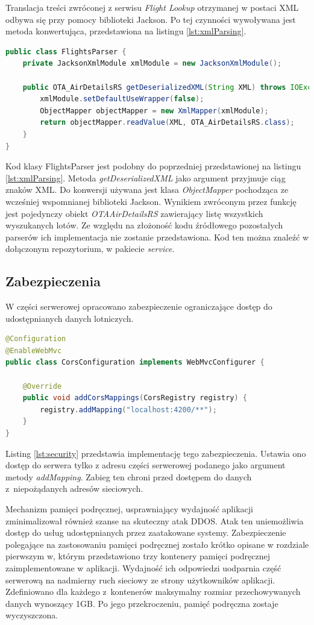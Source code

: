 \documentclass[12pt, twoside]{report}
\begin{document}
Translacja treści zwróconej z serwisu \textit{Flight Lookup} otrzymanej w postaci XML odbywa się przy pomocy biblioteki Jackson. Po tej czynności wywoływana jest metoda konwertująca, przedstawiona na listingu \ref{lst:xmlParsing}.
\begin{lstlisting}[language=java, caption=Implementacja parsowania treści XML, label=lst:xmlParsing]
public class FlightsParser {
    private JacksonXmlModule xmlModule = new JacksonXmlModule();

    public OTA_AirDetailsRS getDeserializedXML(String XML) throws IOException {
        xmlModule.setDefaultUseWrapper(false);
        ObjectMapper objectMapper = new XmlMapper(xmlModule);
        return objectMapper.readValue(XML, OTA_AirDetailsRS.class);
    }
}
\end{lstlisting}
Kod klasy FlightsParser jest podobny do poprzedniej przedstawionej na listingu \ref{lst:xmlParsing}. Metoda \textit{getDeserializedXML} jako argument przyjmuje ciąg znaków XML. Do konwersji używana jest klasa \textit{ObjectMapper} pochodząca ze wcześniej wspomnianej biblioteki Jackson. Wynikiem zwróconym przez funkcję jest pojedynczy obiekt \textit{OTAAirDetailsRS} zawierający listę wszystkich wyszukanych lotów.
Ze względu na złożoność kodu źródłowego pozostałych parserów ich implementacja nie zostanie przedstawiona. Kod ten można znaleźć w dołączonym repozytorium, w pakiecie \textit{service}.

\subsection{Zabezpieczenia}
W części serwerowej opracowano zabezpieczenie ograniczające dostęp do udostępnianych danych lotniczych.
\begin{lstlisting}[language=java, caption=Implementacja zabezpieczanie dostępu do serwera, label=lst:security]
@Configuration
@EnableWebMvc
public class CorsConfiguration implements WebMvcConfigurer {

    @Override
    public void addCorsMappings(CorsRegistry registry) {
        registry.addMapping("localhost:4200/**");
    }
}
\end{lstlisting}
Listing \ref{lst:security} przedstawia implementację tego zabezpieczenia. Ustawia ono dostęp do serwera tylko z adresu części serwerowej podanego jako argument metody \textit{addMapping}. Zabieg ten chroni przed dostępem do danych z~niepożądanych adresów sieciowych. 

Mechanizm pamięci podręcznej, usprawniający wydajność aplikacji zminimalizował również szanse na skuteczny atak DDOS. Atak ten uniemożliwia dostęp do usług udostępnianych przez zaatakowane systemy\cite{ddos}. Zabezpieczenie polegające na zastosowaniu pamięci podręcznej zostało krótko opisane w rozdziale pierwszym w, którym przedstawiono trzy kontenery pamięci podręcznej zaimplementowane w aplikacji. Wydajność ich odpowiedzi uodparnia część serwerową na nadmierny ruch sieciowy ze strony użytkowników aplikacji. Zdefiniowano dla każdego z~kontenerów maksymalny rozmiar przechowywanych danych wynoszący 1GB. Po jego przekroczeniu, pamięć podręczna zostaje wyczyszczona.
\end{document}
